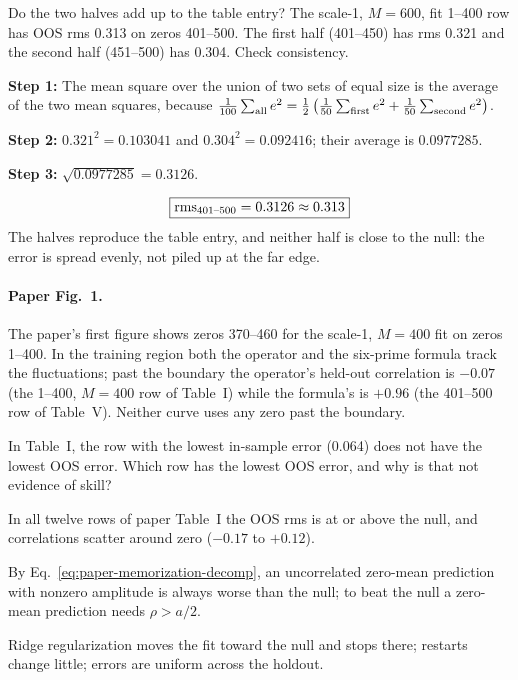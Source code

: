 \begin{sample}{Do the two halves add up to the table entry?}
The scale-1, $M=600$, fit 1--400 row has OOS rms 0.313 on zeros 401--500. The first half (401--450) has rms 0.321 and the second half (451--500) has 0.304. Check consistency.

\textbf{Step 1:} The mean square over the union of two sets of equal size is the average of the two mean squares, because $\frac{1}{100}\sum_{\rm all}e^2=\frac12\left(\frac{1}{50}\sum_{\rm first}e^2+\frac{1}{50}\sum_{\rm second}e^2\right)$.

\textbf{Step 2:} $0.321^2=0.103041$ and $0.304^2=0.092416$; their average is $0.0977285$.

\textbf{Step 3:} $\sqrt{0.0977285}=0.3126$.

\[
\boxed{\mathrm{rms}_{401\text{--}500}=0.3126\approx0.313}
\]
The halves reproduce the table entry, and neither half is close to the null: the error is spread evenly, not piled up at the far edge.
\end{sample}

\paragraph{Paper Fig.~1.} The paper's first figure shows zeros 370--460 for the scale-1, $M=400$ fit on zeros 1--400. In the training region both the operator and the six-prime formula track the fluctuations; past the boundary the operator's held-out correlation is $-0.07$ (the 1--400, $M=400$ row of Table~I) while the formula's is $+0.96$ (the 401--500 row of Table~V). Neither curve uses any zero past the boundary.

\begin{checkpoint}
In Table~I, the row with the lowest in-sample error (0.064) does not have the lowest OOS error. Which row has the lowest OOS error, and why is that not evidence of skill?
\end{checkpoint}

\begin{keyideas}
\item In all twelve rows of paper Table~I the OOS rms is at or above the null, and correlations scatter around zero ($-0.17$ to $+0.12$).
\item By Eq.~\eqref{eq:paper-memorization-decomp}, an uncorrelated zero-mean prediction with nonzero amplitude is always worse than the null; to beat the null a zero-mean prediction needs $\rho>a/2$.
\item Ridge regularization moves the fit toward the null and stops there; restarts change little; errors are uniform across the holdout.
\end{keyideas}

